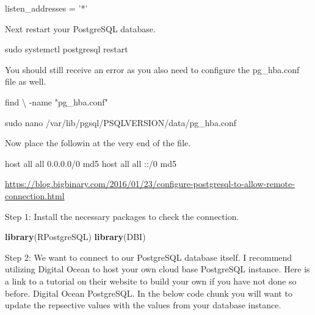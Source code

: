 \documentclass[]{book}
\newenvironment{Shaded}{\begin{snugshade}}{\end{snugshade}}
\newcommand{\KeywordTok}[1]{\textcolor[rgb]{0.13,0.29,0.53}{\textbf{#1}}}
\newcommand{\DataTypeTok}[1]{\textcolor[rgb]{0.13,0.29,0.53}{#1}}
\newcommand{\StringTok}[1]{\textcolor[rgb]{0.31,0.60,0.02}{#1}}
\newcommand{\FunctionTok}[1]{\textcolor[rgb]{0.00,0.00,0.00}{#1}}
\newcommand{\ExtensionTok}[1]{#1}
\newcommand{\NormalTok}[1]{#1}
\begin{document}
\begin{Shaded}
\begin{Highlighting}[]
\ExtensionTok{listen_addresses}\NormalTok{ = }\StringTok{'*'}
\end{Highlighting}
\end{Shaded}

Next restart your PostgreSQL database.

\begin{Shaded}
\begin{Highlighting}[]
\FunctionTok{sudo}\NormalTok{ systemctl postgresql restart}
\end{Highlighting}
\end{Shaded}

You should still receive an error as you also need to configure the
pg\_hba.conf file as well.

\begin{Shaded}
\begin{Highlighting}[]
\FunctionTok{find} \DataTypeTok{\textbackslash{} }\NormalTok{-name }\StringTok{"pg_hba.conf"}

\FunctionTok{sudo}\NormalTok{ nano /var/lib/pgsql/PSQLVERSION/data/pg_hba.conf}
\end{Highlighting}
\end{Shaded}

Now place the followin at the very end of the file.

\begin{Shaded}
\begin{Highlighting}[]
\ExtensionTok{host}\NormalTok{    all             all              0.0.0.0/0                       md5}
\ExtensionTok{host}\NormalTok{    all             all              ::/0                            md5}
\end{Highlighting}
\end{Shaded}

\url{https://blog.bigbinary.com/2016/01/23/configure-postgresql-to-allow-remote-connection.html}

Step 1: Install the necessary packages to check the connection.

\begin{Shaded}
\begin{Highlighting}[]
\KeywordTok{library}\NormalTok{(RPostgreSQL)}
\KeywordTok{library}\NormalTok{(DBI)}
\end{Highlighting}
\end{Shaded}

Step 2: We want to connect to our PostgreSQL database itself. I
recommend utilizing Digital Ocean to host your own cloud base PostgreSQL
instance. Here is a link to a tutorial on their website to build your
own if you have not done so before. Digital Ocean PostgreSQL. In the
below code chunk you will want to update the repsective values with the
values from your database instance.
\end{document}
